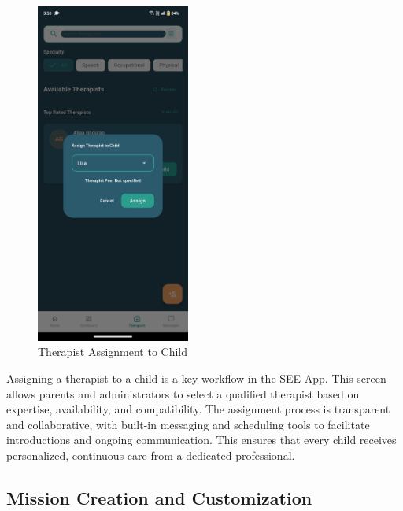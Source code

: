 ﻿\documentclass[12pt,a4paper]{article}
\newcommand{\sectiontitle}[1]{\subsection{#1}}
\begin{document}
\begin{figure}[H]
    \centering
    \includegraphics[width=0.45\textwidth]{Screenshots/therapistassignmenttochild.png}
    \caption{Therapist Assignment to Child}
    \label{fig:therapist-assignment}
\end{figure}
Assigning a therapist to a child is a key workflow in the SEE App. This screen allows parents and administrators to select a qualified therapist based on expertise, availability, and compatibility. The assignment process is transparent and collaborative, with built-in messaging and scheduling tools to facilitate introductions and ongoing communication. This ensures that every child receives personalized, continuous care from a dedicated professional.

\sectiontitle{Mission Creation and Customization}
\end{document}

